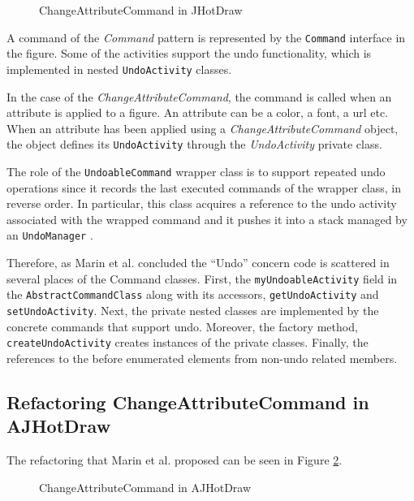 \begin{figure} [H]
	\centering
  	\caption{ChangeAttributeCommand in JHotDraw}
  	\label{fig:JHotDraw_Undo_Command_ChangeAttributeCommand_OOP}
\end{figure}

A command of the \textit{Command} pattern is represented by the \texttt{Command} interface in the figure. 
Some of the activities support the undo functionality, which is implemented in nested \texttt{UndoActivity} classes.

In the case of the \textit{ChangeAttributeCommand}, the command is called when an attribute is applied to a figure.
An attribute can be a color, a font, a url etc.
When an attribute has been applied using a \textit{ChangeAttributeCommand} object, the object defines its \texttt{UndoActivity} through the \textit{UndoActivity} private class.

The role of the \texttt{UndoableCommand} wrapper class is to support repeated undo operations since it records the last executed commands of the wrapper class, in reverse order.
In particular, this class acquires a reference to the undo activity associated with the wrapped command and it pushes it into a stack managed by an \texttt{UndoManager} \cite{marin2004refactoring}.

Therefore, as Marin et al. concluded \cite{marin2004identifying} the ``Undo'' concern code is scattered in several places of the Command classes.
First, the \texttt{myUndoableActivity} field in the \texttt{AbstractCommandClass} along with its accessors, \texttt{getUndoActivity} and \texttt{setUndoActivity}.
Next, the private nested classes are implemented by the concrete commands that support undo.
Moreover, the factory method, \texttt{createUndoActivity} creates instances of the private classes.
Finally, the references to the before enumerated elements from non-undo related members.

\subsection{Refactoring ChangeAttributeCommand in AJHotDraw}
The refactoring that Marin et al. proposed can be seen in Figure \ref{fig:JHotDraw_Undo_Command_ChangeAttributeCommand_AOP}.

\begin{figure} [H]
	\centering
  	\caption{ChangeAttributeCommand in AJHotDraw}
  	\label{fig:JHotDraw_Undo_Command_ChangeAttributeCommand_AOP}
\end{figure}

